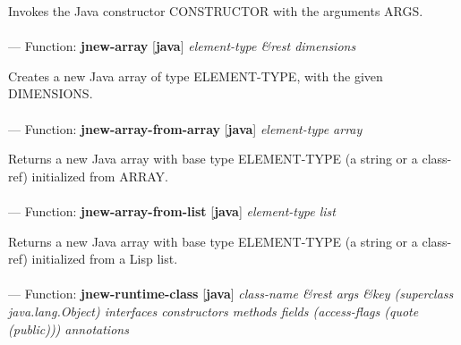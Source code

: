 \begin{adjustwidth}{5em}{5em}
Invokes the Java constructor CONSTRUCTOR with the arguments ARGS.
\end{adjustwidth}

\paragraph{}
\label{JAVA:JNEW-ARRAY}
--- Function: \textbf{jnew-array} [\textbf{java}] \textit{element-type \&rest dimensions}

\begin{adjustwidth}{5em}{5em}
Creates a new Java array of type ELEMENT-TYPE, with the given DIMENSIONS.
\end{adjustwidth}

\paragraph{}
\label{JAVA:JNEW-ARRAY-FROM-ARRAY}
--- Function: \textbf{jnew-array-from-array} [\textbf{java}] \textit{element-type array}

\begin{adjustwidth}{5em}{5em}
Returns a new Java array with base type ELEMENT-TYPE (a string or a class-ref)
   initialized from ARRAY.
\end{adjustwidth}

\paragraph{}
\label{JAVA:JNEW-ARRAY-FROM-LIST}
--- Function: \textbf{jnew-array-from-list} [\textbf{java}] \textit{element-type list}

\begin{adjustwidth}{5em}{5em}
Returns a new Java array with base type ELEMENT-TYPE (a string or a class-ref)
   initialized from a Lisp list.
\end{adjustwidth}

\paragraph{}
\label{JAVA:JNEW-RUNTIME-CLASS}
--- Function: \textbf{jnew-runtime-class} [\textbf{java}] \textit{class-name \&rest args \&key (superclass java.lang.Object) interfaces constructors methods fields (access-flags (quote (public))) annotations}

